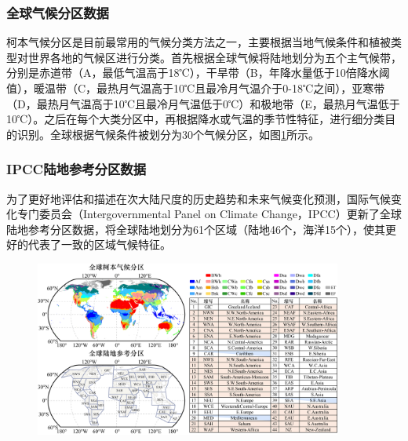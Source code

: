 \subsubsection{全球气候分区数据}

柯本气候分区是目前最常用的气候分类方法之一，主要根据当地气候条件和植被类型对世界各地的气候区进行分类\cite{peelUpdatedWorldMap2007,beckPresentFutureKoppenGeiger2018}。首先根据全球气候将陆地划分为五个主气候带，分别是赤道带（A，最低气温高于18℃），干旱带（B，年降水量低于10倍降水阈值），暖温带（C，最热月气温高于10℃且最冷月气温介于0-18℃之间），亚寒带（D，最热月气温高于10℃且最冷月气温低于0℃）和极地带（E，最热月气温低于10℃）。之后在每个大类分区中，再根据降水或气温的季节性特征，进行细分类目的识别。全球根据气候条件被划分为30个气候分区，如图\ref{fig:Global_Region_Data}所示。

\subsubsection{IPCC陆地参考分区数据}

为了更好地评估和描述在次大陆尺度的历史趋势和未来气候变化预测，国际气候变化专门委员会（Intergovernmental Panel on Climate Change，IPCC）更新了全球陆地参考分区数据\cite{iturbideUpdateIPCCClimate2020}，将全球陆地划分为61个区域（陆地46个，海洋15个），使其更好的代表了一致的区域气候特征。

\begin{figure}[H]
	\centering
	\includegraphics[width=0.9\textwidth]{figures/chap2/Global_Region.jpg}
	\label{fig:Global_Region_Data}
\end{figure}

\clearpage